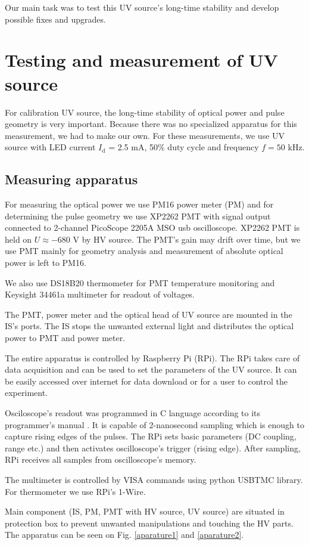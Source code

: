 Our main task was to test this UV source's long-time stability and develop possible fixes and upgrades.


\section{Testing and measurement of UV source}
For calibration UV source, the long-time stability of optical power and pulse geometry is very important. Because there was no specialized apparatus for this measurement, we had to make our own. For these measurements, we use UV source with LED current $I_{\textrm{d}}$ = 2.5 mA, 50$\%$ duty cycle and frequency $f = 50$ kHz. 
\subsection{Measuring apparatus}
For measuring the optical power we use PM16 power meter (PM) and for determining the pulse geometry we use XP2262 PMT with signal output connected to 2-channel PicoScope 2205A MSO usb oscilloscope. XP2262 PMT is held on $U \approx -680$ V by HV source. The PMT's gain may drift over time, but we use PMT mainly for geometry analysis and measurement of absolute optical power is left to PM16.
\par
We also use DS18B20 thermometer for PMT temperature monitoring and Keysight 34461a multimeter for readout of voltages.

\par
The PMT, power meter and the optical head of UV source are mounted in the IS's ports. The IS stops the unwanted external light and distributes the optical power to PMT and power meter. 
\par
The entire apparatus is controlled by Raspberry Pi (RPi). The RPi takes care of data acquisition and can be used to set the parameters of the UV source. It can be easily accessed over internet for data download or for a user to control the experiment.
\par
Osciloscope's readout was programmed in C language according to its programmer's manual \cite{PicoScope}. It is capable of 2-nanosecond sampling which is enough to capture rising edges of the pulses. The RPi sets basic parameters (DC coupling, range etc.) and then activates oscilloscope's trigger (rising edge). After sampling, RPi receives all samples from oscilloscope's memory.
\par
The multimeter is controlled by VISA commands using python USBTMC library. For thermometer we use RPi's 1-Wire.
\par
Main component (IS, PM, PMT with HV source, UV source) are situated in protection box to prevent unwanted manipulations and touching the HV parts. The apparatus can be seen on Fig. \ref{aparature1} and \ref{aparature2}.

